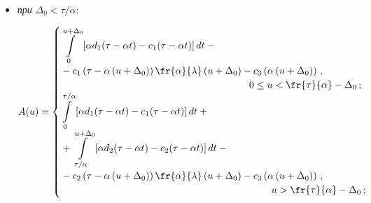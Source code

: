   \begin{itemize}

  \item \textit{при}  $\Delta_0<\tau/\alpha$:

  \begin{equation}

  A(u)=

  \begin{cases}

  \displaystyle

  \int\limits_0^{u+\Delta_0} \left[ \alpha d_1(\tau-\alpha t)-c_1(\tau-\alpha 

t)\right] dt -{}\\

\displaystyle{}-c_1\left( \tau-\alpha\left( 

u+ {\Delta_0}\right)\right)\fr{\alpha}{\lambda}\left(u+\Delta_0\right)-

c_3\left( \alpha\left( u+\Delta_0\right)\right)\,,\\

&\hspace*{-30mm} 0\leq u< 

\displaystyle \fr{\tau}{\alpha}-\Delta_0\,;

  \\

  \displaystyle 

  \int\limits_0^{\tau/\alpha} \left[ \alpha d_1(\tau-\alpha t)-c_1(\tau-\alpha 

t)\right] dt + {}\\

\displaystyle{}+\int\limits_{\tau/\alpha}^{u+\Delta_0} 

\left[ \alpha d_2(\tau-\alpha t) -

c_2 (\tau-\alpha t)\right]dt-{}\\

  {}- c_2\left( \tau-\alpha\left( 

u+\Delta_0\right)\right)\fr{\alpha}{\lambda}\left(u+\Delta_0\right) -

c_3\left(\alpha\left(u+\Delta_0\right)\right)\,,\\

& \hspace*{-22mm}\displaystyle

u>\fr{\tau}{\alpha}-\Delta_0\,;

\end{cases}

  \label{e3-sh}

  \end{equation}


\end{itemize}
